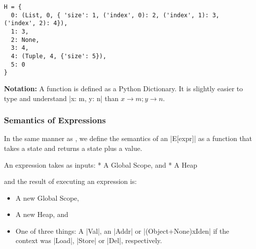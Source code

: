 \begin{verbatim}
H = {
  0: (List, 0, { 'size': 1, ('index', 0): 2, ('index', 1): 3, ('index', 2): 4}),
  1: 3,
  2: None,
  3: 4,
  4: (Tuple, 4, {'size': 5}),
  5: 0
}
\end{verbatim}

\textbf{Notation:} A function is defined as a Python Dictionary. It is
slightly easier to type and understand \pycode|{x: m, y: n}| than
\(x \rightarrow m; y \rightarrow n\).

\subsubsection*{Semantics of Expressions}

In the same manner as \textcite{fromherz_static_2018}, we define the
semantics of an \pycode|E[expr]| as a function that
takes a state and returns a state plus a value.

An expression takes as inputs: * A Global Scope, and * A Heap

and the result of executing an expression is:

\begin{itemize}
\tightlist
\item
  A new Global Scope,
\item
  A new Heap, and
\item
  One of three things: A \pycode|Val|, an \pycode|Addr| or
  \pycode|(Object+None)xIden| if the context was \pycode|Load|,
  \pycode|Store| or \pycode|Del|, respectively.
\end{itemize}

{}

